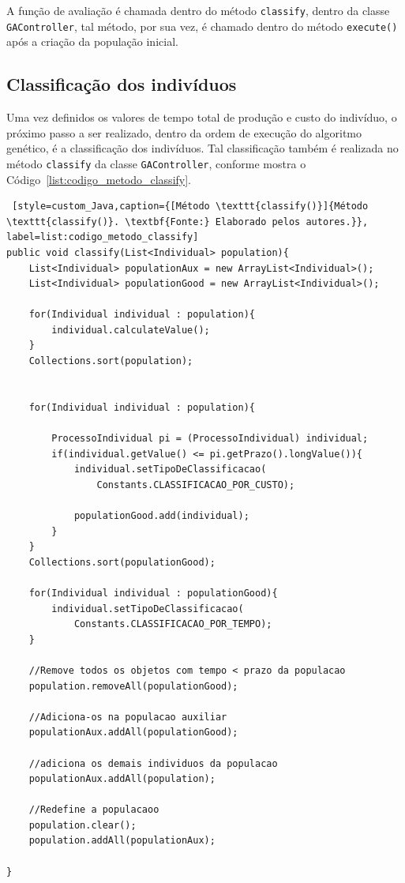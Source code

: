 \par A função de avaliação é chamada dentro do método \texttt{classify}, dentro da classe \texttt{GACont\-roller}, tal método, 
por sua vez, é chamado dentro do método \texttt{execute()} após a criação da população inicial.

\subsection{Classificação dos indivíduos}
\par Uma vez definidos os valores de tempo total de produção e custo do indivíduo, o próximo passo a ser realizado, dentro da
ordem de execução do algoritmo genético, é a classificação dos indivíduos. Tal classificação também é realizada no método 
\texttt{classify} da classe \texttt{GAController}, conforme mostra o Código~\ref{list:codigo_metodo_classify}.


\begin{lstlisting} [style=custom_Java,caption={[Método \texttt{classify()}]{Método \texttt{classify()}. \textbf{Fonte:} Elaborado pelos autores.}}, label=list:codigo_metodo_classify] 
public void classify(List<Individual> population){
	List<Individual> populationAux = new ArrayList<Individual>();
	List<Individual> populationGood = new ArrayList<Individual>();
	
	for(Individual individual : population){
		individual.calculateValue();
	}
	Collections.sort(population);
		
		
	for(Individual individual : population){
			
		ProcessoIndividual pi = (ProcessoIndividual) individual;
		if(individual.getValue() <= pi.getPrazo().longValue()){
			individual.setTipoDeClassificacao(
				Constants.CLASSIFICACAO_POR_CUSTO);
				
			populationGood.add(individual);
		}
	}
	Collections.sort(populationGood);
				
	for(Individual individual : populationGood){
		individual.setTipoDeClassificacao(
			Constants.CLASSIFICACAO_POR_TEMPO);
	}
					
	//Remove todos os objetos com tempo < prazo da populacao
	population.removeAll(populationGood);
				
	//Adiciona-os na populacao auxiliar
	populationAux.addAll(populationGood);
					
	//adiciona os demais individuos da populacao
	populationAux.addAll(population);
				
	//Redefine a populacaoo
	population.clear();
	population.addAll(populationAux);
					
}
						
\end{lstlisting}

